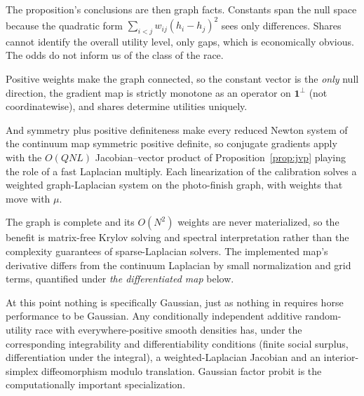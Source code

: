 \documentclass[12pt]{article}
\theoremstyle{remark}
\begin{document}
The proposition's conclusions are then
graph facts. Constants span the null space because the quadratic form
$\sum_{i<j} w_{ij}(h_i - h_j)^2$ sees only differences. Shares cannot
identify the overall utility level, only gaps, which is economically
obvious. The odds do not inform us of the class of the race.

Positive weights make the graph
connected, so the constant vector is the \emph{only} null direction, the
gradient map is strictly monotone as an operator on $\mathbf{1}^\perp$
(not coordinatewise), and shares determine utilities uniquely.

And symmetry plus positive definiteness make every reduced Newton
system of the continuum map symmetric positive definite, so conjugate
gradients apply with the $O(QNL)$ Jacobian--vector product of
Proposition~\ref{prop:jvp} playing the role of a fast Laplacian
multiply. Each linearization of the calibration solves a weighted
graph-Laplacian system on the photo-finish graph, with weights that move
with $\mu$.

The graph is complete and its $O(N^2)$ weights are never
materialized, so the benefit is matrix-free Krylov solving and spectral
interpretation rather than the complexity guarantees of sparse-Laplacian
solvers. The implemented map's derivative differs from the continuum
Laplacian by small normalization and grid terms, quantified under
\emph{the differentiated map} below.

At this point nothing is specifically Gaussian, just as nothing in
\citet{cotton2021} requires horse performance to be Gaussian. Any conditionally independent additive random-utility race with
everywhere-positive smooth densities has, under the corresponding
integrability and differentiability conditions (finite social surplus,
differentiation under the integral), a weighted-Laplacian Jacobian and an
interior-simplex diffeomorphism modulo translation. Gaussian factor
probit is the computationally important specialization.
\end{document}
